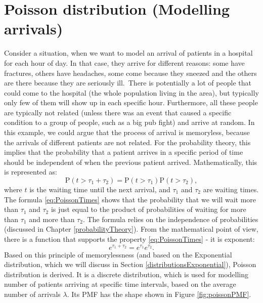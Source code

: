 \documentclass[
]{book}
\theoremstyle{definition}
\theoremstyle{definition}
\theoremstyle{definition}
\theoremstyle{definition}
\theoremstyle{remark}
\begin{document}
\section{Poisson distribution (Modelling arrivals)}\label{distributionPoisson}

Consider a situation, when we want to model an arrival of patients in a hospital for each hour of day. In that case, they arrive for different reasons: some have fractures, others have headaches, some come because they sneezed and the others are there because they are seriously ill.~There is potentially a lot of people that could come to the hospital (the whole population living in the area), but typically only few of them will show up in each specific hour. Furthermore, all these people are typically not related (unless there was an event that caused a specific condition to a group of people, such as a big pub fight) and arrive at random. In this example, we could argue that the process of arrival is memoryless, because the arrivals of different patients are not related. For the probability theory, this implies that the probability that a patient arrives in a specific period of time should be independent of when the previous patient arrived. Mathematically, this is represented as:
\begin{equation}
    \mathrm{P}(t > \tau_1 + \tau_2) = \mathrm{P}(t > \tau_1)\mathrm{P}(t > \tau_2),
    \label{eq:PoissonTimes}
\end{equation}
where \(t\) is the waiting time until the next arrival, and \(\tau_1\) and \(\tau_2\) are waiting times. The formula \eqref{eq:PoissonTimes} shows that the probability that we will wait more than \(\tau_1\) and \(\tau_2\) is just equal to the product of probabilities of waiting for more than \(\tau_1\) and more than \(\tau_2\). The formula relies on the independence of probabilities (discussed in Chapter \ref{probabilityTheory}). From the mathematical point of view, there is a function that supports the property \eqref{eq:PoissonTimes} - it is exponent:
\begin{equation}
    e^{\tau_1 + \tau_2} = e^{\tau_1} e^{\tau_2} .
    \label{eq:PoissonTimesExp}
\end{equation}
Based on this principle of memorylessness (and based on the Exponential distribution, which we will discuss in Section \ref{distributionsExponential}), Poisson distribution is derived. It is a discrete distribution, which is used for modelling number of patients arriving at specific time intervals, based on the average number of arrivals \(\lambda\). Its PMF has the shape shown in Figure \ref{fig:poissonPMF}.
\end{document}

